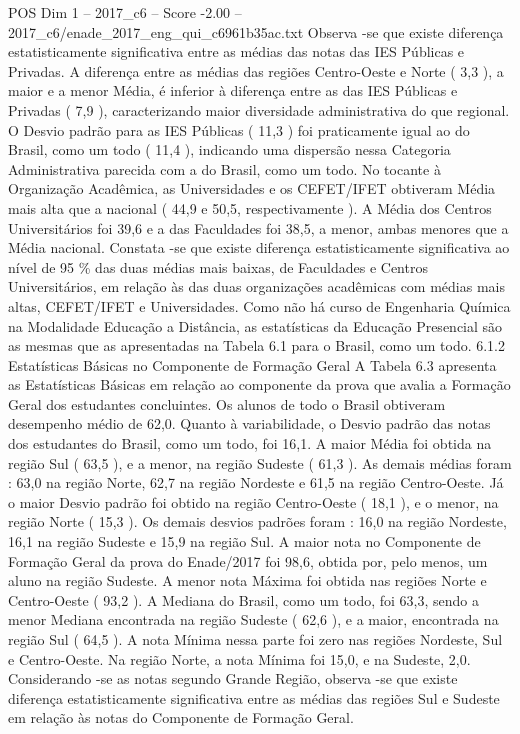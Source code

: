 \begin{textsample}{POS Dim 1 – 2017\_c6 – Score -2.00 – 2017\_c6/enade\_2017\_eng\_qui\_c6961b35ac.txt}
Observa -se que existe diferença estatisticamente significativa entre as médias das notas das IES Públicas e Privadas.
A diferença entre as médias das regiões Centro-Oeste e Norte ( 3,3 ), a maior e a menor Média, é inferior à diferença entre as das IES Públicas e Privadas ( 7,9 ), caracterizando maior diversidade administrativa do que regional.
O Desvio padrão para as IES Públicas ( 11,3 ) foi praticamente igual ao do Brasil, como um todo ( 11,4 ), indicando uma dispersão nessa Categoria Administrativa parecida com a do Brasil, como um todo.
No tocante à Organização Acadêmica, as Universidades e os CEFET/IFET obtiveram Média mais alta que a nacional ( 44,9 e 50,5, respectivamente ).
A Média dos Centros Universitários foi 39,6 e a das Faculdades foi 38,5, a menor, ambas menores que a Média nacional.
Constata -se que existe diferença estatisticamente significativa ao nível de 95 \% das duas médias mais baixas, de Faculdades e Centros Universitários, em relação às das duas organizações acadêmicas com médias mais altas, CEFET/IFET e Universidades.
Como não há curso de Engenharia Química na Modalidade Educação a Distância, as estatísticas da Educação Presencial são as mesmas que as apresentadas na Tabela 6.1 para o Brasil, como um todo. 6.1.2 Estatísticas Básicas no Componente de Formação Geral A Tabela 6.3 apresenta as Estatísticas Básicas em relação ao componente da prova que avalia a Formação Geral dos estudantes concluintes.
Os alunos de todo o Brasil obtiveram desempenho médio de 62,0.
Quanto à variabilidade, o Desvio padrão das notas dos estudantes do Brasil, como um todo, foi 16,1.
A maior Média foi obtida na região Sul ( 63,5 ), e a menor, na região Sudeste ( 61,3 ).
As demais médias foram : 63,0 na região Norte, 62,7 na região Nordeste e 61,5 na região Centro-Oeste.
Já o maior Desvio padrão foi obtido na região Centro-Oeste ( 18,1 ), e o menor, na região Norte ( 15,3 ).
Os demais desvios padrões foram : 16,0 na região Nordeste, 16,1 na região Sudeste e 15,9 na região Sul.
A maior nota no Componente de Formação Geral da prova do Enade/2017 foi 98,6, obtida por, pelo menos, um aluno na região Sudeste.
A menor nota Máxima foi obtida nas regiões Norte e Centro-Oeste ( 93,2 ).
A Mediana do Brasil, como um todo, foi 63,3, sendo a menor Mediana encontrada na região Sudeste ( 62,6 ), e a maior, encontrada na região Sul ( 64,5 ).
A nota Mínima nessa parte foi zero nas regiões Nordeste, Sul e Centro-Oeste.
Na região Norte, a nota Mínima foi 15,0, e na Sudeste, 2,0.
Considerando -se as notas segundo Grande Região, observa -se que existe diferença estatisticamente significativa entre as médias das regiões Sul e Sudeste em relação às notas do Componente de Formação Geral.

\end{textsample}
